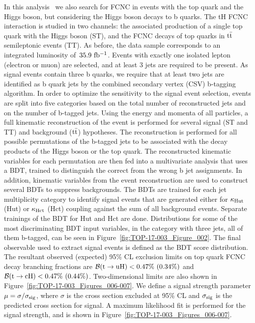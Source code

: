 \documentclass{PoS}
\begin{document}
In this analysis~\cite{top-17-003} we also search for FCNC in events with the
top quark and the Higgs boson, but considering the Higgs boson decays to b
quarks. The tH FCNC interaction is studied in two channels: the associated
production of a single top quark with the Higgs boson (ST), and the FCNC decays
of top quarks in ${\rm t{\bar t}}$ semileptonic events (TT). As before, the data
sample corresponds to an integrated luminosity of~${\rm 35.9~fb^{-1}}$. Events
with exactly one isolated lepton (electron or muon) are selected, and at least
3 jets are required to be present. As signal events contain three b quarks,
we require that at least two jets are identified as b quark jets by the combined
secondary vertex (CSV) b-tagging algorithm. In order to optimize the sensitivity
to the signal event selection, events are split into five categories based on
the total number of reconstructed jets and on the number of b-tagged jets.
Using the energy and momenta of all particles, a full kinematic reconstruction
of the event is performed for several signal (ST and TT) and background
(${\rm t{\bar t}}$) hypotheses. The reconstruction is performed for all possible
permutations of the b-tagged jets to be associated with the decay products of
the Higgs boson or the top quark. The reconstructed kinematic variables for each
permutation are then fed  into a multivariate analysis that uses a BDT, trained
to distinguish the correct from the wrong b jet assignments. In addition,
kinematic variables from the event reconstruction are used to construct several
BDTs to suppress backgrounds. The BDTs are trained for each jet multiplicity
category to identify signal events that are generated either for
${\rm \kappa_{Hut}}$ (Hut) or ${\rm \kappa_{Hct}}$ (Hct) coupling against the
sum of all background events. Separate trainings of the BDT for Hut and Hct are
done. Distributions for some of the most discriminating BDT input variables,
in the category with three jets, all of them b-tagged, can be seen in
Figure~\ref{fig:TOP-17-003_Figure_002}. The final observable used to extract
signal events is defined as the BDT score distribution. The resultant observed
(expected) 95\% CL exclusion limits on top quark FCNC decay branching fractions
are ${\cal B}({\rm t \to uH}) < 0.47\%~(0.34\%)$ and
${\cal B}({\rm t \to cH}) < 0.47\%~(0.44\%)$. Two-dimensional limits are also
shown in Figure~\ref{fig:TOP-17-003_Figures_006-007}. We define a signal strength
parameter $\mu = \sigma/\sigma_{\rm sig}$, where $\sigma$ is the cross section
excluded at 95\% CL and $\sigma_{\rm sig}$ is the predicted cross section for
signal. A maximum likelihood fit is performed for the signal strength, and is
shown in Figure~\ref{fig:TOP-17-003_Figures_006-007}.
\end{document}
